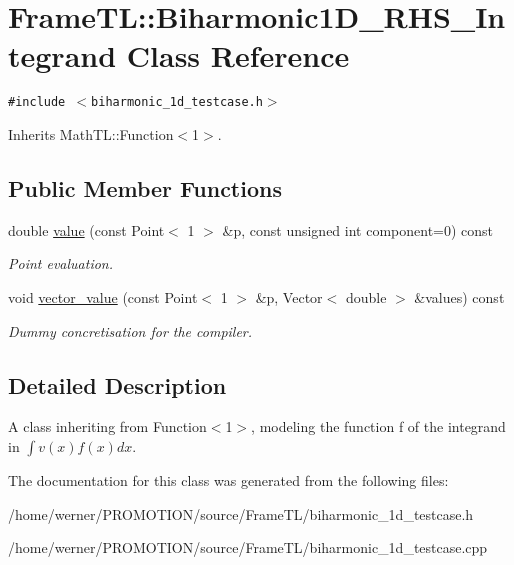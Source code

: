 \hypertarget{classFrameTL_1_1Biharmonic1D__RHS__Integrand}{
\section{FrameTL::Biharmonic1D\_\-RHS\_\-Integrand Class Reference}
\label{classFrameTL_1_1Biharmonic1D__RHS__Integrand}
}
{\tt \#include $<$biharmonic\_\-1d\_\-testcase.h$>$}

Inherits MathTL::Function$<$1$>$.

\subsection*{Public Member Functions}
\begin{CompactItemize}
\item 
\hypertarget{classFrameTL_1_1Biharmonic1D__RHS__Integrand_174357ca2c524475a0d66b98375a7ccb}{
double \hyperlink{classFrameTL_1_1Biharmonic1D__RHS__Integrand_174357ca2c524475a0d66b98375a7ccb}{value} (const Point$<$ 1 $>$ \&p, const unsigned int component=0) const }
\label{classFrameTL_1_1Biharmonic1D__RHS__Integrand_174357ca2c524475a0d66b98375a7ccb}

\begin{CompactList}\small\item\em Point evaluation. \item\end{CompactList}\item 
\hypertarget{classFrameTL_1_1Biharmonic1D__RHS__Integrand_6de019d91743507faf5f828c39e0327b}{
void \hyperlink{classFrameTL_1_1Biharmonic1D__RHS__Integrand_6de019d91743507faf5f828c39e0327b}{vector\_\-value} (const Point$<$ 1 $>$ \&p, Vector$<$ double $>$ \&values) const }
\label{classFrameTL_1_1Biharmonic1D__RHS__Integrand_6de019d91743507faf5f828c39e0327b}

\begin{CompactList}\small\item\em Dummy concretisation for the compiler. \item\end{CompactList}\end{CompactItemize}


\subsection{Detailed Description}
A class inheriting from Function$<$1$>$, modeling the function f of the integrand in $\int v(x) f(x) dx$. 

The documentation for this class was generated from the following files:\begin{CompactItemize}
\item 
/home/werner/PROMOTION/source/FrameTL/biharmonic\_\-1d\_\-testcase.h\item 
/home/werner/PROMOTION/source/FrameTL/biharmonic\_\-1d\_\-testcase.cpp\end{CompactItemize}
